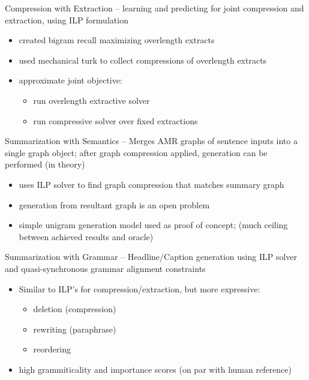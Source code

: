 \documentclass{beamer}
\begin{document}
\begin{frame}{Compression with Extraction}
    \cite{berg2011jointly} -- learning and predicting for joint compression and
    extraction, using ILP formulation
    \begin{itemize}
    \item created bigram recall maximizing overlength extracts
    \item used mechanical turk to collect compressions of overlength extracts
    \item approximate joint objective: 
        \begin{itemize}
            \item run overlength extractive solver
            \item run compressive solver over fixed extractions
        \end{itemize}
    \end{itemize}
\end{frame}

\begin{frame}{Summarization with Semantics}
    \cite{liu2015toward} -- Merges AMR graphs of sentence inputs into a single
    graph object; after graph compression applied, generation can be performed
    (in theory)
    \begin{itemize}
    \item uses ILP solver to find graph compression that matches summary graph
    \item generation from resultant graph is an open problem
    \item simple unigram generation model used as proof of concept; 
        (much ceiling between achieved results and oracle) 
    \end{itemize}
\end{frame}


\begin{frame}{Summarization with Grammar}
    \cite{woodsend2010generation} -- Headline/Caption generation using ILP 
    solver and quasi-synchronous grammar alignment constraints
    \begin{itemize}
    \item Similar to ILP's for compression/extraction, but more expressive:
       \begin{itemize}
           \item deletion (compression)
           \item rewriting (paraphrase)
           \item reordering 
       \end{itemize}
   \item high grammiticality and importance scores (on par with human 
       reference)
    \end{itemize}
\end{frame}
\end{document}
